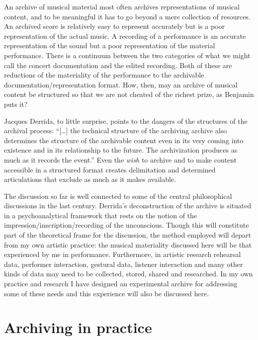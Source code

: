\documentclass[12pt]{article}
\begin{document}
An archive of musical material most often archives representations of musical content, and to be meaningful it has to go beyond a mere collection of resources. An archived score is relatively easy to represent accurately but is a poor representation of the actual music. A recording of a performance is an accurate representation of the sound but a poor representation of the material performance. There is a continuum between the two categories of what we might call the concert documentation and the edited recording. Both of these are reductions of the materiality of the performance to the archivable documentation/representation format. How, then, may an archive of musical content be structured so that we are not cheated of the richest prize, as Benjamin puts it? 

Jacques Derrida, to little surprise, points to the dangers of the structures of the archival process: ``[\ldots] the technical structure of the archiving archive also determines the structure of the archivable content even in its very coming into existence and in its relationship to the future. The archivization produces as much as it records the event.'' \citep[p. 17]{derrida1998} Even the \emph{wish} to archive and to make content accessible in a structured format creates delimitation and determined articulations that exclude as much as it makes available.

The discussion so far is well connected to some of the central philosophical discussions in the last century. Derrida's deconstruction of the archive is situated in a psychoanalytical framework that rests on the notion of the impression/inscription/recording of the unconscious. Though this will constitute part of the theoretical frame for the discussion, the method employed will depart from my own artistic practice: the musical materiality discussed here will be that experienced by me in performance. Furthermore, in artistic research rehearsal data, performer interaction, gestural data, listener interaction and many other kinds of data may need to be collected, stored, shared and researched. In my own practice and research I have designed an experimental archive for addressing some of these needs and this experience will also be discussed here.

\section{Archiving in practice}
\label{sec:archiving-practice}
\end{document}
